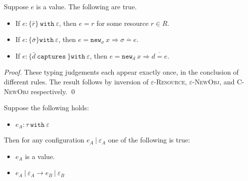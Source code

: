 \documentclass{llncs}
\newcommand{\keywadj}[1]{\mathtt{#1}}
\newcommand{\keyw}[1]{\keywadj{#1}~}
\begin{document}
\begin{lemma}[Atom]
Suppose $e$ is a value. The following are true.
\begin{itemize} 
	\item If $e : \{ \bar r \}~\keyw{with} \varepsilon$, then $e = r$ for some resource $r \in R$.
	\item If $e : \{ \bar \sigma \} \keyw{with} \varepsilon$, then $e = \keywadj{new}_{\sigma}~x \Rightarrow \overline{\sigma = e}$.
	\item If $e : \{ \bar d~\keyw{captures} \} \keyw{with} \varepsilon$, then $e = \keywadj{new}_{d}~x \Rightarrow \overline{ d = e }$.
\end{itemize}
\end{lemma}

\begin{proof}
These typing judgements each appear exactly once, in the conclusion of different rules. The result follows by inversion of \textsc{$\varepsilon$-Resource}, \textsc{$\varepsilon$-NewObj}, and \textsc{C-NewObj} respectively. \qed
\end{proof}

\begin{theorem}[Progress]
Suppose the following holds:
\begin{itemize}
	\item $e_A : \tau~\keyw{with} \varepsilon$
\end{itemize}

\noindent
Then for any configuration $e_A~|~\varepsilon_A$ one of the following is true:
\begin{itemize}
	\item $e_A$ is a value.
	\item $e_A~|~\varepsilon_A \longrightarrow e_B~|~\varepsilon_B$
\end{itemize}
\end{theorem}
\end{document}
